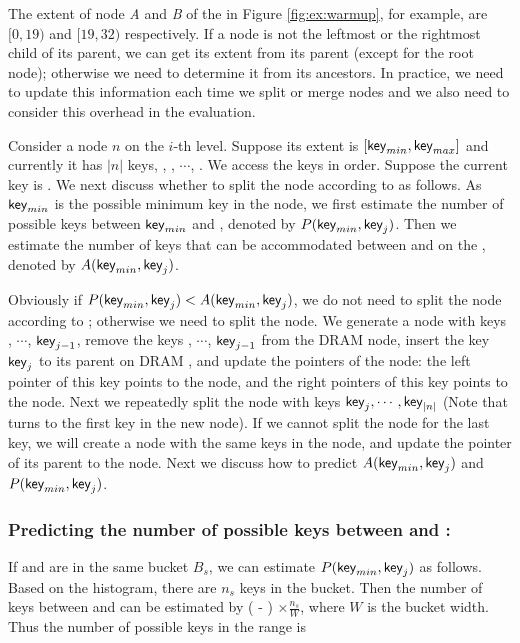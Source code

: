 The extent of node \emph{A} and \emph{B} of the \bplustree in Figure \ref{fig:ex:warmup}, for example, are $[0,19)$ and $[19,32)$ respectively. If a node is not the leftmost or the rightmost child of its parent, we can get its extent from its parent (except for the root node); otherwise we need to determine it from its ancestors. In practice, we need to update this information each time we split or merge nodes and we also need to consider this overhead in the evaluation. 


Consider a \bplustree node $n$ on the $i$-th level. Suppose its extent is $[\textsf{key}_{min},\textsf{key}_{max}]$ and currently it has $|n|$ keys, , , $\cdots$, . We access the keys in order. Suppose the current key is . We next discuss whether to split the node according to  as follows. As $\textsf{key}_{min}$ is the possible minimum key in the node, we first estimate the number of possible keys between $\textsf{key}_{min}$ and , denoted by $P(\textsf{key}_{min}, \textsf{key}_{j})$. Then we estimate the number of keys that can be accommodated between \el and  on the \bptree, denoted by $A(\textsf{key}_{min}, \textsf{key}_{j})$.


Obviously if $P(\textsf{key}_{min}, \textsf{key}_{j})<A(\textsf{key}_{min}, \textsf{key}_{j})$, we do not need to split the node according to ; otherwise we need to split the node. We generate a \bptree node with keys \el, $\cdots$, $\textsf{key}_{j-1}$, remove the keys \el, $\cdots$, $\textsf{key}_{j-1}$ from the DRAM \bplustree node, insert the key $\textsf{key}_{j}$ to its parent on DRAM \bplustree, and update the pointers of the \bplustree node: the left pointer of this key points to the \bptree node, and the right pointers of this key points to the \bplustree node. Next we repeatedly split the node with keys $\textsf{key}_{j}, \cdots, \textsf{key}_{|n|}$ (Note that  turns to the first key in the new node). If we cannot split the node for the last key, we will create a \bptree node with the same keys in the \bplustree node, and update the pointer of its parent to the \bptree node. Next we discuss how to predict $A(\textsf{key}_{min}, \textsf{key}_{j})$ and $P(\textsf{key}_{min}, \textsf{key}_{j})$.

\mbox{}

\subsubsection{Predicting the number of possible keys between \el and :} 
If \el and  are in the same bucket $B_s$, we can estimate $P(\textsf{key}_{min}, \textsf{key}_{j})$ as follows. Based on the histogram, there are $n_s$ keys in the bucket. Then the number of keys between \el and  can be estimated by ( - \el) $\times \frac{n_s}{W}$, where $W$ is the bucket width. Thus the number of possible keys in the range is

